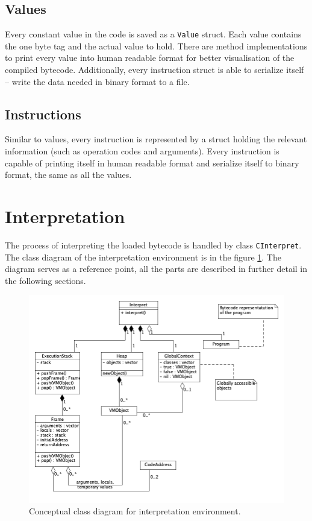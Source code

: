 \documentclass[thesis=M,english]{FITthesis}[2019/12/23]
\begin{document}
\subsection{Values}
Every constant value in the code is saved as a \texttt{Value} struct. Each value contains the one byte tag and the actual value to hold. There are method implementations
to print every value into human readable format for better visualisation of the compiled bytecode. Additionally, every instruction struct is able to serialize itself -- 
write the data needed in binary format to a file.

\subsection{Instructions}
Similar to values, every instruction is represented by a struct holding the relevant information (such as operation codes and arguments). Every instruction is capable
of printing itself in human readable format and serialize itself to binary format, the same as all the values.

\section{Interpretation}
The process of interpreting the loaded bytecode is handled by class \texttt{CInterpret}. The class diagram of the interpretation environment is
in the figure \ref{fig:interpret_classDiagram}. The diagram serves as a reference point, all the parts are described in further detail in the
following sections.

\begin{figure}[h!]
	\centering
	\includegraphics[width=\textwidth]{media/interpret_class.png}
	\caption{Conceptual class diagram for interpretation environment.}
	\label{fig:interpret_classDiagram}
\end{figure}
\end{document}
